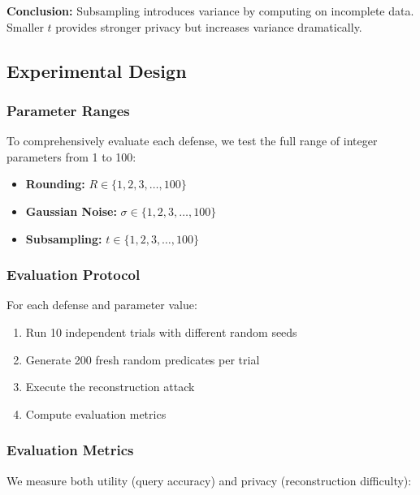 \documentclass[11pt,letterpaper]{article}
\begin{document}
\textbf{Conclusion:} Subsampling introduces variance by computing on incomplete data. Smaller $t$ provides stronger privacy but increases variance dramatically.

\subsection{Experimental Design}

\subsubsection{Parameter Ranges}

To comprehensively evaluate each defense, we test the full range of integer parameters from 1 to 100:

\begin{itemize}[leftmargin=*]
    \item \textbf{Rounding:} $R \in \{1, 2, 3, \ldots, 100\}$
    \item \textbf{Gaussian Noise:} $\sigma \in \{1, 2, 3, \ldots, 100\}$
    \item \textbf{Subsampling:} $t \in \{1, 2, 3, \ldots, 100\}$
\end{itemize}

\subsubsection{Evaluation Protocol}

For each defense and parameter value:

\begin{enumerate}[leftmargin=*]
    \item Run 10 independent trials with different random seeds
    \item Generate 200 fresh random predicates per trial
    \item Execute the reconstruction attack
    \item Compute evaluation metrics
\end{enumerate}

\subsubsection{Evaluation Metrics}

We measure both utility (query accuracy) and privacy (reconstruction difficulty):
\end{document}
